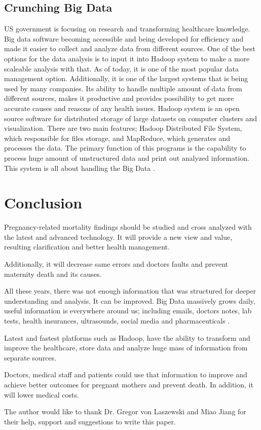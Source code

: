 \documentclass[sigconf]{acmart}
\begin{document}
\subsection{Crunching Big Data}

US government is focusing on research and transforming healthcare knowledge. Big data software becoming accessible and being developed for efficiency and made it easier to collect and analyze data from different sources. One of the best options for the data analysis is to input it into Hadoop system to make a more scaleable analysis with that. As of today, it is one of the most popular data management option. Additionally, it is one of the largest systems that is being used by many companies. Its ability to handle multiple amount of data from different sources, makes it productive and provides possibility to get more accurate causes and reasons of any health issues. Hadoop system is an open source software for distributed storage of large datasets on computer clusters and visualization. There are two main features; Hadoop Distributed File System, which responsible for files storage, and MapReduce, which generates and processes the data. The primary function of this programs is the capability to process huge amount of unstructured data and print out analyzed information. This system is all about handling the Big Data \cite{dittrich2012efficient}.

\section{Conclusion}

Pregnancy-related mortality findings should be studied and cross analyzed with the latest and advanced technology. It will provide a new view and value, resulting clarification and better health management. 

Additionally, it will decrease same errors and doctors faults and prevent maternity death and its causes.

All these years, there was not enough information that was structured for deeper understanding and analysis. It can be improved. Big Data massively grows daily, useful information is everywhere around us; including emails, doctor\textquotesingle s notes, lab tests, health insurances, ultrasounds, social media and pharmaceuticals .

Latest and fastest platforms such as Hadoop, have the ability to transform and improve the healthcare, store data and analyze huge mass of information from separate sources.

Doctors, medical staff and patients could use that information to improve and achieve better outcomes for pregnant mothers and prevent death. 
In addition, it will lower medical costs.


\begin{acks}

  The author would like to thank Dr. Gregor von Laszewski and Miao Jiang for their help, support and suggestions to write this paper.

\end{acks}


 
\end{document}
